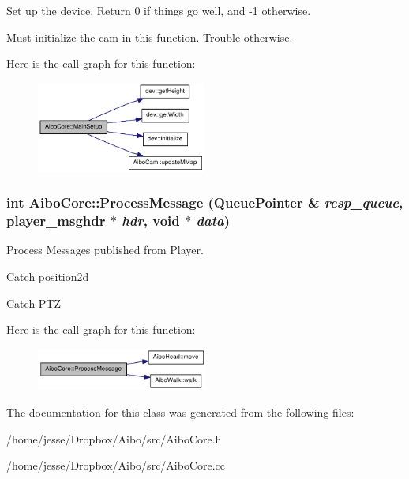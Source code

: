 Set up the device. Return 0 if things go well, and -\/1 otherwise. 

Must initialize the cam in this function. Trouble otherwise. 

Here is the call graph for this function:\nopagebreak
\begin{figure}[H]
\begin{center}
\leavevmode
\includegraphics[width=158pt]{classAiboCore_a940aa3f41c521cfc8e1ea69b8a616648_cgraph}
\end{center}
\end{figure}
\hypertarget{classAiboCore_a2612cdb01d22f3b18fa0c42ec15b4525}{
\subsubsection[{ProcessMessage}]{\setlength{\rightskip}{0pt plus 5cm}int AiboCore::ProcessMessage (QueuePointer \& {\em resp\_\-queue}, \/  player\_\-msghdr $\ast$ {\em hdr}, \/  void $\ast$ {\em data})}}
\label{classAiboCore_a2612cdb01d22f3b18fa0c42ec15b4525}


Process Messages published from Player. 

Catch position2d

Catch PTZ 

Here is the call graph for this function:\nopagebreak
\begin{figure}[H]
\begin{center}
\leavevmode
\includegraphics[width=160pt]{classAiboCore_a2612cdb01d22f3b18fa0c42ec15b4525_cgraph}
\end{center}
\end{figure}


The documentation for this class was generated from the following files:\begin{DoxyCompactItemize}
\item 
/home/jesse/Dropbox/Aibo/src/AiboCore.h\item 
/home/jesse/Dropbox/Aibo/src/AiboCore.cc\end{DoxyCompactItemize}
